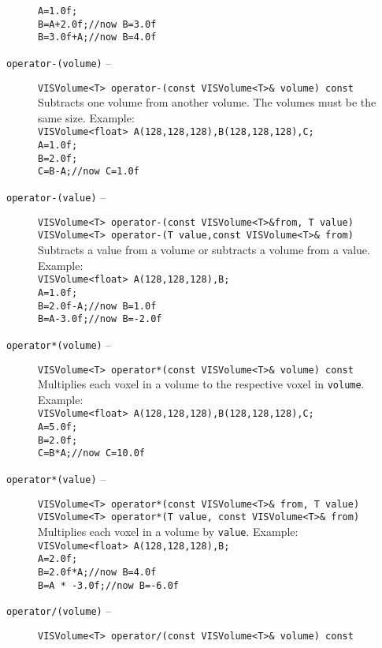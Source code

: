 \begin{description}
{\tt A=1.0f;}\\
{\tt B=A+2.0f;//now B=3.0f}\\
{\tt B=3.0f+A;//now B=4.0f}
\item[{\tt operator-(volume)} --]
{\tt VISVolume<T> operator-(const VISVolume<T>\& volume) const}\\
Subtracts one volume from another volume.
The volumes must be the same size.  Example:\\
{\tt VISVolume<float> A(128,128,128),B(128,128,128),C;}\\
{\tt A=1.0f;}\\
{\tt B=2.0f;}\\
{\tt C=B-A;//now C=1.0f}
\item[{\tt operator-(value)} --]
{\tt VISVolume<T> operator-(const VISVolume<T>\&from, T value)}\\
{\tt VISVolume<T> operator-(T value,const VISVolume<T>\& from)}\\
Subtracts a value from a volume or subtracts a volume from a value.
Example:\\
{\tt VISVolume<float> A(128,128,128),B;}\\
{\tt A=1.0f;}\\
{\tt B=2.0f-A;//now B=1.0f}\\
{\tt B=A-3.0f;//now B=-2.0f}
\item[{\tt operator*(volume)} --]
{\tt VISVolume<T> operator*(const VISVolume<T>\& volume) const}\\
Multiplies each voxel in a volume to the respective voxel in
{\tt volume}.  Example:\\
{\tt VISVolume<float> A(128,128,128),B(128,128,128),C;}\\
{\tt A=5.0f;}\\
{\tt B=2.0f;}\\
{\tt C=B*A;//now C=10.0f}
\item[{\tt operator*(value)} --]
{\tt VISVolume<T> operator*(const VISVolume<T>\& from, T value)}\\
{\tt VISVolume<T> operator*(T value, const VISVolume<T>\& from)}\\
Multiplies each voxel in a volume by {\tt value}.
Example:\\
{\tt VISVolume<float> A(128,128,128),B;}\\
{\tt A=2.0f;}\\
{\tt B=2.0f*A;//now B=4.0f}\\
{\tt B=A * -3.0f;//now B=-6.0f}
\item[{\tt operator/(volume)} --]
{\tt VISVolume<T> operator/(const VISVolume<T>\& volume) const}\\

\end{description}
